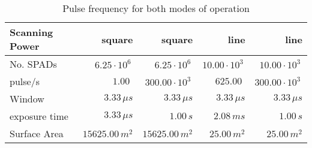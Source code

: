 \begin{table}[H]
\centering
\caption{Pulse frequency for both modes of operation}
\label{tab:scanning_power}
\begin{tabular}{|l|rrrr|}\hline
    \textbf{Scanning Power} & square & square & line & line \\
    \hline 
    No. SPADs & $6.25\cdot10^6\,$ & $6.25\cdot10^6\,$ & $10.00\cdot10^3\,$ & $10.00\cdot10^3\,$ \\
    pulse/s & $1.00\,\,$ & $300.00\cdot10^3\,$ & $625.00\,\,$ & $300.00\cdot10^3\,$ \\
    Window & $3.33\,\mu s$ & $3.33\,\mu s$ & $3.33\,\mu s$ & $3.33\,\mu s$ \\
    exposure time & $3.33\,\mu s$ & $1.00\, s$ & $2.08\,m s$ & $1.00\, s$ \\
    Surface Area & $15625.00\, m^2$ & $15625.00\, m^2$ & $25.00\, m^2$ & $25.00\, m^2$ \\
    \hline 
\end{tabular}
\end{table}
